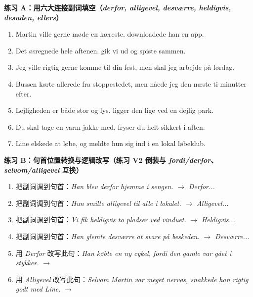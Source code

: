 
\textbf{练习 A：用六大连接副词填空（\textit{derfor, alligevel, desværre, heldigvis, desuden, ellers}）}
\begin{enumerate}
  \item Martin ville gerne møde en kæreste. \underline{\hspace{2.4cm}} downloadede han en app.
  \item Det øsregnede hele aftenen. \underline{\hspace{2.4cm}} gik vi ud og spiste sammen.
  \item Jeg ville rigtig gerne komme til din fest, men \underline{\hspace{2.4cm}} skal jeg arbejde på lørdag.
  \item Bussen kørte allerede fra stoppestedet, men \underline{\hspace{2.4cm}} nåede jeg den næste ti minutter efter.
  \item Lejligheden er både stor og lys. \underline{\hspace{2.4cm}} ligger den lige ved en dejlig park.
  \item Du skal tage en varm jakke med, \underline{\hspace{2.4cm}} fryser du helt sikkert i aften.
  \item Line elskede at løbe, og \underline{\hspace{2.4cm}} meldte hun sig ind i en lokal løbeklub.
\end{enumerate}

\textbf{练习 B：句首位置转换与逻辑改写（练习 V2 倒装与 \textit{fordi/derfor}、\textit{selvom/alligevel} 互换）}
\begin{enumerate}
  \item 把副词调到句首：\textit{Han blev derfor hjemme i sengen.} $\rightarrow$ \textit{Derfor...}
  \item 把副词调到句首：\textit{Hun smilte alligevel til alle i lokalet.} $\rightarrow$ \textit{Alligevel...}
  \item 把副词调到句首：\textit{Vi fik heldigvis to pladser ved vinduet.} $\rightarrow$ \textit{Heldigvis...}
  \item 把副词调到句首：\textit{Han glemte desværre at svare på beskeden.} $\rightarrow$ \textit{Desværre...}
  \item 用 \textit{Derfor} 改写此句：\textit{Han købte en ny cykel, fordi den gamle var gået i stykker.} $\rightarrow$
  \item 用 \textit{Alligevel} 改写此句：\textit{Selvom Martin var meget nervøs, snakkede han rigtig godt med Line.} $\rightarrow$
\end{enumerate}

